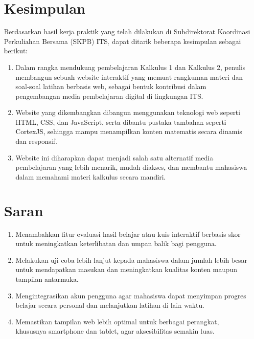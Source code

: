 \documentclass{file/KP-ITS}
\theoremstyle{definition}
\theoremstyle{definition}
\theoremstyle{plain}
\begin{document}
\section{Kesimpulan}
Berdasarkan hasil kerja praktik yang telah dilakukan di Subdirektorat Koordinasi Perkuliahan Bersama (SKPB) ITS, dapat ditarik beberapa kesimpulan sebagai berikut:
\begin{enumerate}
    \item Dalam rangka mendukung pembelajaran Kalkulus 1 dan Kalkulus 2, penulis membangun sebuah website interaktif yang memuat rangkuman materi dan soal-soal latihan berbasis web, sebagai bentuk kontribusi dalam pengembangan media pembelajaran digital di lingkungan ITS.
    \item Website yang dikembangkan dibangun menggunakan teknologi web seperti HTML, CSS, dan JavaScript, serta dibantu pustaka tambahan seperti CortexJS, sehingga mampu menampilkan konten matematis secara dinamis dan responsif.
    \item Website ini diharapkan dapat menjadi salah satu alternatif media pembelajaran yang lebih menarik, mudah diakses, dan membantu mahasiswa dalam memahami materi kalkulus secara mandiri.
\end{enumerate}
\section{Saran}
\begin{enumerate}
    \item Menambahkan fitur evaluasi hasil belajar atau kuis interaktif berbasis skor untuk meningkatkan keterlibatan dan umpan balik bagi pengguna.
    \item Melakukan uji coba lebih lanjut kepada mahasiswa dalam jumlah lebih besar untuk mendapatkan masukan dan meningkatkan kualitas konten maupun tampilan antarmuka.
    \item Mengintegrasikan akun pengguna agar mahasiswa dapat menyimpan progres belajar secara personal dan melanjutkan latihan di lain waktu.
    \item Memastikan tampilan web lebih optimal untuk berbagai perangkat, khususnya smartphone dan tablet, agar aksesibilitas semakin luas.
\end{enumerate}



\DaftarPustaka
\end{document}

